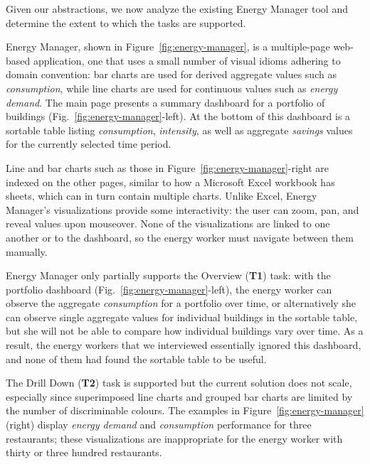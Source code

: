 \documentclass[journal]{vgtc}                %
\newcommand{\bstart}[1]{\vspace{1mm} \noindent{\textbf{#1:}}}
\newcommand{\tm}[1]{\textcolor{red}{#1}}
\begin{document}

Given our abstractions, we now analyze the existing Energy Manager tool and determine the extent to which the tasks are supported.


Energy Manager, shown in Figure~\ref{fig:energy-manager}, is a multiple-page web-based application, one that uses a small number of visual idioms adhering to domain convention: bar charts are used for derived aggregate values such as {\it consumption}, while line charts are used for continuous values such as {\it energy demand}.
The main page presents a summary dashboard for a portfolio of buildings (Fig.~\ref{fig:energy-manager}-left). 
At the bottom of this dashboard is a sortable table listing {\it consumption}, {\it intensity}, as well as aggregate {\it savings} values for the currently selected time period. 

Line and bar charts such as those in Figure~\ref{fig:energy-manager}-right are indexed on the other pages, similar to how a Microsoft Excel workbook has sheets, which can in turn contain multiple charts. 
Unlike Excel, Energy Manager's visualizations provide some interactivity: the user can zoom, pan, and reveal values upon mouseover. 
None of the visualizations are linked to one another or to the dashboard, so the energy worker must navigate between them manually.

\bstart{Task support} Energy Manager only partially supports the Overview ({\bf T1}) task: with the portfolio dashboard (Fig.~\ref{fig:energy-manager}-left), the energy worker can observe the aggregate {\it consumption} for a portfolio over time, or alternatively she can observe single aggregate values for individual buildings in the sortable table, but she will not be able to compare how individual buildings vary over time.
As a result, the energy workers that we interviewed essentially ignored this dashboard, and none of them had found the sortable table to be useful. 

The Drill Down ({\bf T2}) task is supported but the current solution does not scale, especially since superimposed line charts and grouped bar charts are limited by the number of discriminable colours.
The examples in Figure~\ref{fig:energy-manager} (right) display {\it energy demand} and {\it consumption} performance for three restaurants; these visualizations are inappropriate for the energy worker with thirty or three hundred restaurants.
\end{document}
